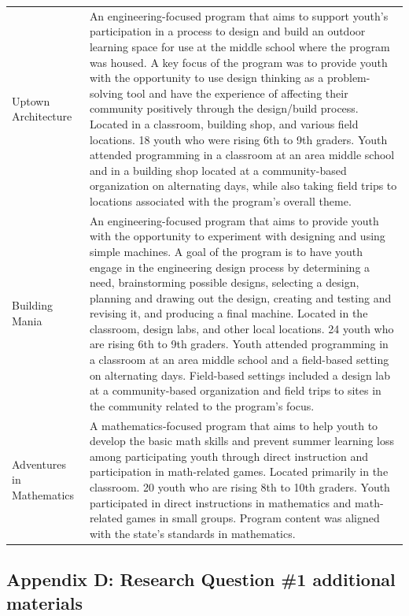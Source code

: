 \documentclass[]{book}
\theoremstyle{definition}
\theoremstyle{definition}
\theoremstyle{definition}
\theoremstyle{remark}
\begin{document}
\begin{landscape}
\begin{table}
\begin{tabular}[t]{ll}
Uptown Architecture & An engineering-focused program that aims to support youth's participation in a process to design and build an outdoor learning space for use at the middle school where the program was housed. A key focus of the program was to provide youth with the opportunity to use design thinking as a problem-solving tool and have the experience of affecting their community positively through the design/build process. Located in a classroom, building shop, and various field locations. 18 youth who were rising 6th to 9th graders. Youth attended programming in a classroom at an area middle school and in a building shop located at a community-based organization on alternating days, while also taking field trips to locations associated with the program's overall theme.\\
Building Mania & An engineering-focused program that aims to provide youth with the opportunity to experiment with designing and using simple machines. A goal of the program is to have youth engage in the engineering design process by determining a need, brainstorming possible designs, selecting a design, planning and drawing out the design, creating and testing and revising it, and producing a final machine. Located in the classroom, design labs, and other local locations. 24 youth who are rising 6th to 9th graders. Youth attended programming in a classroom at an area middle school and a field-based setting on alternating days. Field-based settings included a design lab at a community-based organization and field trips to sites in the community related to the program's focus.\\
Adventures in Mathematics & A mathematics-focused program that aims to help youth to develop the basic math skills and prevent summer learning loss among participating youth through direct instruction and participation in math-related games. Located primarily in the classroom. 20 youth who are rising 8th to 10th graders. Youth participated in direct instructions in mathematics and math-related games in small groups. Program content was aligned with the state's standards in mathematics.\\
\bottomrule
\end{tabular}
\end{table}
\end{landscape}

\subsection{Appendix D: Research Question \#1 additional
materials}\label{appendix-d-research-question-1-additional-materials}
\end{document}
